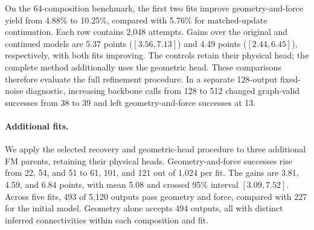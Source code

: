 On the 64-composition benchmark, the first two fits improve geometry-and-force yield from 4.88\% to 10.25\%, compared with 5.76\% for matched-update continuation. Each row contains 2,048 attempts. Gains over the original and continued models are 5.37 points ($[3.56,7.13]$) and 4.49 points ($[2.44,6.45]$), respectively, with both fits improving. The controls retain their physical head; the complete method additionally uses the geometric head. These comparisons therefore evaluate the full refinement procedure. In a separate 128-output fixed-noise diagnostic, increasing backbone calls from 128 to 512 changed graph-valid successes from 38 to 39 and left geometry-and-force successes at 13.

\paragraph{Additional fits.}
We apply the selected recovery and geometric-head procedure to three additional FM parents, retaining their physical heads. Geometry-and-force successes rise from 22, 54, and 51 to 61, 101, and 121 out of 1,024 per fit. The gains are 3.81, 4.59, and 6.84 points, with mean 5.08 and crossed 95\% interval $[3.09,7.52]$. Across five fits, 493 of 5,120 outputs pass geometry and force, compared with 227 for the initial model. Geometry alone accepts 494 outputs, all with distinct inferred connectivities within each composition and fit.
